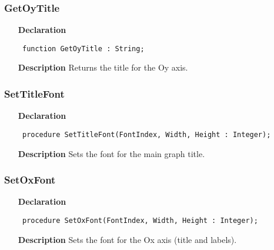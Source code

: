 \documentclass[12pt,a4paper,oneside]{report}
\newcommand{\declarationitem}[1]{\textbf{#1}}
\newcommand{\descriptiontitle}[1]{\textbf{#1}}
\newcommand{\code}[1]{\texttt{#1}}
\begin{document}
\subsubsection{GetOyTitle}
\label{uplot-GetOyTitle}
\begin{itemize}\item[\declarationitem{Declaration}\hfill]
	\begin{flushleft}
		\code{
			function GetOyTitle : String;}
		
	\end{flushleft}
	
	\par
	\item[\descriptiontitle{Description}]
	Returns the title for the Oy axis.
	
\end{itemize}
\subsubsection{SetTitleFont}
\label{uplot-SetTitleFont}
\begin{itemize}\item[\declarationitem{Declaration}\hfill]
	\begin{flushleft}
		\code{
			procedure SetTitleFont(FontIndex, Width, Height : Integer);}
		
	\end{flushleft}
	
	\par
	\item[\descriptiontitle{Description}]
	Sets the font for the main graph title.
	
\end{itemize}
\subsubsection{SetOxFont}
\label{uplot-SetOxFont}
\begin{itemize}\item[\declarationitem{Declaration}\hfill]
	\begin{flushleft}
		\code{
			procedure SetOxFont(FontIndex, Width, Height : Integer);}
		
	\end{flushleft}
	
	\par
	\item[\descriptiontitle{Description}]
	Sets the font for the Ox axis (title and labels).
	
\end{itemize}
\end{document}
